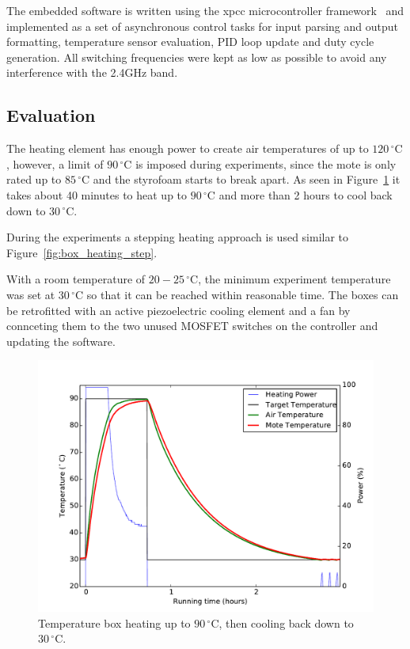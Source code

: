 The embedded software is written using the xpcc microcontroller framework~\cite{xpcc.io} and implemented as a set of asynchronous control tasks for input parsing and output formatting, temperature sensor evaluation, PID loop update and duty cycle generation.
All switching frequencies were kept as low as possible to avoid any interference with the 2.4GHz band.

\subsection{Evaluation}

The heating element has enough power to create air temperatures of up to $120\,^{\circ}\mathrm{C}$, however, a limit of $90\,^{\circ}\mathrm{C}$ is imposed during experiments, since the mote is only rated up to $85\,^{\circ}\mathrm{C}$ and the styrofoam starts to break apart.
As seen in Figure~\ref{fig:box_heating_cooling} it takes about 40 minutes to heat up to $90\,^{\circ}\mathrm{C}$ and more than 2 hours to cool back down to $30\,^{\circ}\mathrm{C}$.

During the experiments a stepping heating approach is used similar to Figure~\ref{fig:box_heating_step}.

With a room temperature of $20-25\,^{\circ}\mathrm{C}$, the minimum experiment temperature was set at $30\,^{\circ}\mathrm{C}$ so that it can be reached within reasonable time.
The boxes can be retrofitted with an active piezoelectric cooling element and a fan by connceting them to the two unused MOSFET switches on the controller and updating the software.

\begin{figure}[t]
	\centering
    \includegraphics[width=1\columnwidth]{figures/box_heating_cooling}
	\caption{Temperature box heating up to $90\,^{\circ}\mathrm{C}$, then cooling back down to $30\,^{\circ}\mathrm{C}$.}
    \label{fig:box_heating_cooling}
\end{figure}

